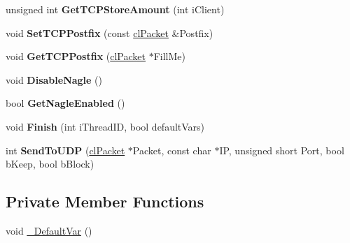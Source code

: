\begin{DoxyCompactItemize}
\item 
\hypertarget{classcl_instance_a06cd38119a7a640254fbca3baa0c6927}{
unsigned int {\bfseries GetTCPStoreAmount} (int iClient)}
\label{classcl_instance_a06cd38119a7a640254fbca3baa0c6927}

\item 
\hypertarget{classcl_instance_af260a00fd44bb49cc60dde8aaacfe479}{
void {\bfseries SetTCPPostfix} (const \hyperlink{classcl_packet}{clPacket} \&Postfix)}
\label{classcl_instance_af260a00fd44bb49cc60dde8aaacfe479}

\item 
\hypertarget{classcl_instance_a08f036e59197de275d5d1910ea219ea5}{
void {\bfseries GetTCPPostfix} (\hyperlink{classcl_packet}{clPacket} $\ast$FillMe)}
\label{classcl_instance_a08f036e59197de275d5d1910ea219ea5}

\item 
\hypertarget{classcl_instance_aa3e103defe3a1d901edfefc16c52bda5}{
void {\bfseries DisableNagle} ()}
\label{classcl_instance_aa3e103defe3a1d901edfefc16c52bda5}

\item 
\hypertarget{classcl_instance_aaeeeb6b79cf04bdb3700157cdb34de8f}{
bool {\bfseries GetNagleEnabled} ()}
\label{classcl_instance_aaeeeb6b79cf04bdb3700157cdb34de8f}

\item 
\hypertarget{classcl_instance_a77fc796f9ee47fef7145b196e5e5e60b}{
void {\bfseries Finish} (int iThreadID, bool defaultVars)}
\label{classcl_instance_a77fc796f9ee47fef7145b196e5e5e60b}

\item 
\hypertarget{classcl_instance_a42d330a0224cb5007dbbbea8b1abc0f5}{
int {\bfseries SendToUDP} (\hyperlink{classcl_packet}{clPacket} $\ast$Packet, const char $\ast$IP, unsigned short Port, bool bKeep, bool bBlock)}
\label{classcl_instance_a42d330a0224cb5007dbbbea8b1abc0f5}

\end{DoxyCompactItemize}
\subsection*{Private Member Functions}
\begin{DoxyCompactItemize}
\item 
void \hyperlink{classcl_instance_a747b51442108bac2e3d62fa718d8037b}{\_\-DefaultVar} ()
\end{DoxyCompactItemize}


